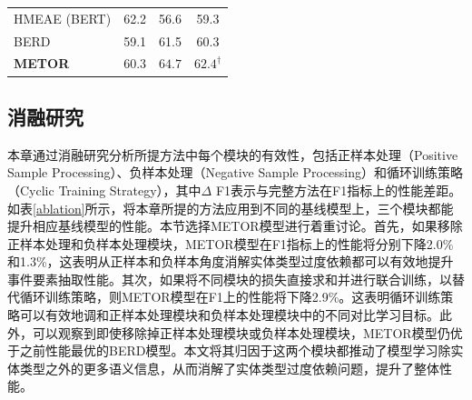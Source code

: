 \begin{table}[htp]
\begin{tabular}{lccc}
\multicolumn{1}{l|}{HMEAE (BERT)} & 62.2                           & 56.6                           & 59.3                           \\
\multicolumn{1}{l|}{BERD}         & 59.1                           & 61.5                           & 60.3                           \\
\multicolumn{1}{l|}{\textbf{METOR}} & 60.3                           & $\boldsymbol{64.7}$          &$\boldsymbol{62.4^{\dagger}}$ \\
\bottomrule
\end{tabular}
\end{table}

\subsection{消融研究}
本章通过消融研究分析所提方法中每个模块的有效性，包括正样本处理（Positive Sample Processing）、负样本处理（Negative Sample Processing）和循环训练策略（Cyclic Training Strategy），其中$\Delta$ F1表示与完整方法在F1指标上的性能差距。如表\ref{ablation}所示，将本章所提的方法应用到不同的基线模型上，三个模块都能提升相应基线模型的性能。本节选择METOR模型进行着重讨论。首先，如果移除正样本处理和负样本处理模块，METOR模型在F1指标上的性能将分别下降2.0\%和1.3\%，这表明从正样本和负样本角度消解实体类型过度依赖都可以有效地提升事件要素抽取性能。其次，如果将不同模块的损失直接求和并进行联合训练，以替代循环训练策略，则METOR模型在F1上的性能将下降2.9\%。这表明循环训练策略可以有效地调和正样本处理模块和负样本处理模块中的不同对比学习目标。此外，可以观察到即使移除掉正样本处理模块或负样本处理模块，METOR模型仍优于之前性能最优的BERD模型。本文将其归因于这两个模块都推动了模型学习除实体类型之外的更多语义信息，从而消解了实体类型过度依赖问题，提升了整体性能。

